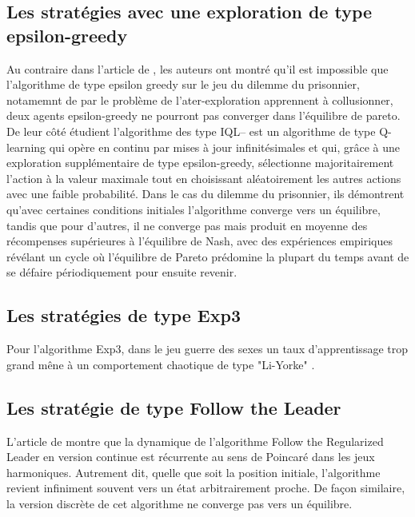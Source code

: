 \documentclass{article}
\theoremstyle{definition}
\begin{document}
\subsection{Les stratégies avec une exploration de type epsilon-greedy}
Au contraire dans l'article de \citet{douglas_naive_2024}, les auteurs ont montré qu'il est impossible que l'algorithme de type epsilon greedy sur le jeu du dilemme du prisonnier, notamemnt de par le problème de l'ater-exploration apprennent à collusionner, deux agents epsilon-greedy ne pourront pas converger dans l'équilibre de pareto. De leur côté \citet{wunder_classes_nodate} étudient l'algorithme des type IQL– est un algorithme de type Q-learning qui opère en continu par mises à jour infinitésimales et qui, grâce à une exploration supplémentaire de type epsilon-greedy, sélectionne majoritairement l'action à la valeur maximale tout en choisissant aléatoirement les autres actions avec une faible probabilité. Dans le cas du dilemme du prisonnier, ils démontrent qu'avec certaines conditions initiales l'algorithme converge vers un équilibre, tandis que pour d'autres, il ne converge pas mais produit en moyenne des récompenses supérieures à l'équilibre de Nash, avec des expériences empiriques révélant un cycle où l'équilibre de Pareto prédomine la plupart du temps avant de se défaire périodiquement pour ensuite revenir.

\subsection{Les stratégies de type Exp3}
Pour l'algorithme Exp3, dans le jeu guerre des sexes un taux d'apprentissage trop grand mêne à un comportement chaotique de type "Li-Yorke" \citet{falniowski_discrete-time_2024}.

\subsection{Les stratégie de type Follow the Leader}
L’article de \citet{legacci_no-regret_2024} montre que la dynamique de l’algorithme Follow the Regularized Leader en version continue est récurrente au sens de Poincaré dans les jeux harmoniques. Autrement dit, quelle que soit la position initiale, l’algorithme revient infiniment souvent vers un état arbitrairement proche. De façon similaire, la version discrète de cet algorithme ne converge pas vers un équilibre. 

\end{document}
